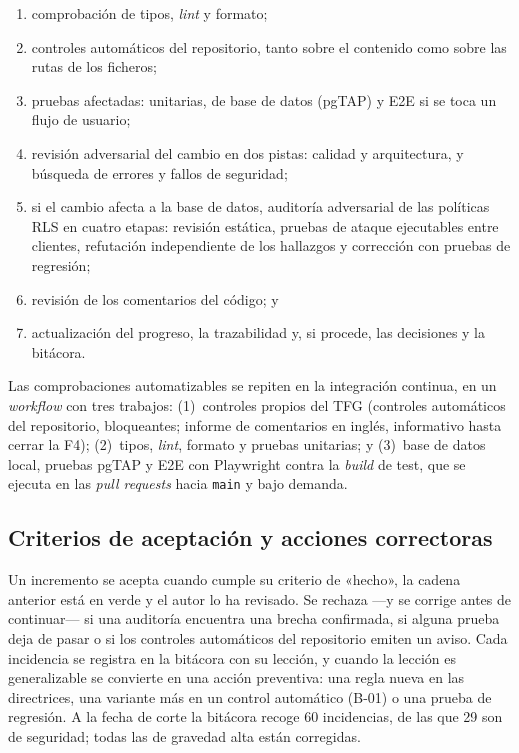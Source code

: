 \begin{enumerate}
  \item comprobación de tipos, \textit{lint} y formato;
  \item controles automáticos del repositorio, tanto sobre el contenido
        como sobre las rutas de los ficheros;
  \item pruebas afectadas: unitarias, de base de datos (pgTAP) y E2E si se
        toca un flujo de usuario;
  \item revisión adversarial del cambio en dos pistas: calidad y
        arquitectura, y búsqueda de errores y fallos de seguridad;
  \item si el cambio afecta a la base de datos, auditoría adversarial de las
        políticas RLS en cuatro etapas: revisión estática, pruebas de ataque
        ejecutables entre clientes, refutación independiente de los hallazgos
        y corrección con pruebas de regresión;
  \item revisión de los comentarios del código; y
  \item actualización del progreso, la trazabilidad y, si procede, las
        decisiones y la bitácora.
\end{enumerate}

Las comprobaciones automatizables se repiten en la integración continua, en un
\textit{workflow} con tres trabajos: (1)~controles propios del TFG
(controles automáticos del repositorio, bloqueantes; informe de comentarios en inglés, informativo hasta
cerrar la F4); (2)~tipos, \textit{lint}, formato y pruebas unitarias; y
(3)~base de datos local, pruebas pgTAP y E2E con Playwright contra la
\textit{build} de test, que se ejecuta en las \textit{pull requests} hacia
\texttt{main} y bajo demanda.

\subsection{Criterios de aceptación y acciones correctoras}

Un incremento se acepta cuando cumple su criterio de «hecho», la cadena
anterior está en verde y el autor lo ha revisado. Se rechaza ---y se corrige
antes de continuar--- si una auditoría encuentra una brecha confirmada, si
alguna prueba deja de pasar o si los controles automáticos del repositorio
emiten un aviso. Cada incidencia se registra en la bitácora con su lección, y
cuando la lección es generalizable se convierte en una acción preventiva: una
regla nueva en las directrices, una variante más en un control automático
(B-01) o una prueba de regresión. A la fecha de corte la bitácora
recoge 60 incidencias, de las que 29 son de seguridad; todas las de gravedad alta están corregidas.
